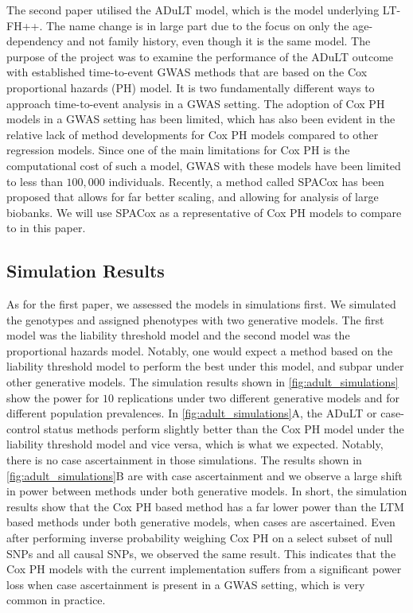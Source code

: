 The second paper utilised the ADuLT model, which is the model underlying LT-FH++. The name change is in large part due to the focus on only the age-dependency and not family history, even though it is the same model. The purpose of the project was to examine the performance of the ADuLT outcome with established time-to-event GWAS methods that are based on the Cox proportional hazards (PH) model. It is two fundamentally different ways to approach time-to-event analysis in a GWAS setting. The adoption of Cox PH models in a GWAS setting has been limited, which has also been evident in the relative lack of method developments for Cox PH models compared to other regression models. Since one of the main limitations for Cox PH is the computational cost of such a model, GWAS with these models have been limited to less than $ 100,000 $ individuals. Recently, a method called SPACox \cite{bi2020fast} has been proposed that allows for far better scaling, and allowing for analysis of large biobanks. We will use SPACox as a representative of Cox PH models to compare to in this paper.

\subsection{Simulation Results}

As for the first paper, we assessed the models in simulations first. We simulated the genotypes and assigned phenotypes with two generative models. The first model was the liability threshold model and the second model was the proportional hazards model. Notably, one would expect a method based on the liability threshold model to perform the best under this model, and subpar under other generative models. The simulation results shown in \cref{fig:adult_simulations} show the power for $ 10 $ replications under two different generative models and for different population prevalences. In \cref{fig:adult_simulations}A, the ADuLT or case-control status methods perform slightly better than the Cox PH model under the liability threshold model and vice versa, which is what we expected. Notably, there is no case ascertainment in those simulations. The results shown in \cref{fig:adult_simulations}B are with case ascertainment and we observe a large shift in power between methods under both generative models. In short, the simulation results show that the Cox PH based method has a far lower power than the LTM based methods under both generative models, when cases are ascertained. Even after performing inverse probability weighing Cox PH on a select subset of null SNPs and all causal SNPs, we observed the same result. This indicates that the Cox PH models with the current implementation suffers from a significant power loss when case ascertainment is present in a GWAS setting, which is very common in practice.

